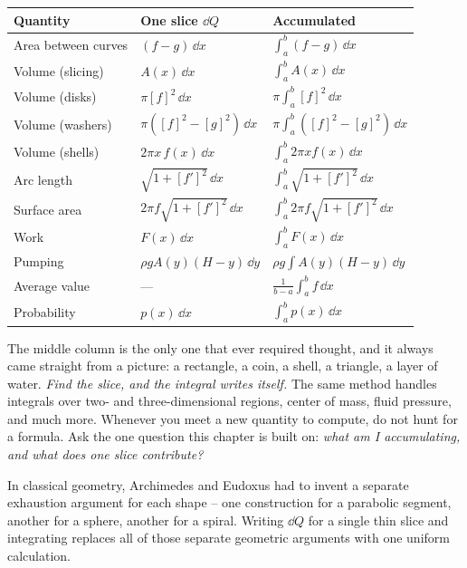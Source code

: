 \begin{center}
\begin{tabular}{@{}lll@{}}
\toprule
\textbf{Quantity} & \textbf{One slice $\dd Q$} & \textbf{Accumulated} \\
\midrule
Area between curves & $(f-g)\,\dd x$ & $\int_a^b (f-g)\,\dd x$ \\
Volume (slicing) & $A(x)\,\dd x$ & $\int_a^b A(x)\,\dd x$ \\
Volume (disks) & $\pi[f]^2\,\dd x$ & $\pi\int_a^b [f]^2\,\dd x$ \\
Volume (washers) & $\pi([f]^2-[g]^2)\,\dd x$ & $\pi\int_a^b([f]^2-[g]^2)\,\dd x$ \\
Volume (shells) & $2\pi x\,f(x)\,\dd x$ & $\int_a^b 2\pi x f(x)\,\dd x$ \\
Arc length & $\sqrt{1+[f']^2}\,\dd x$ & $\int_a^b\sqrt{1+[f']^2}\,\dd x$ \\
Surface area & $2\pi f\sqrt{1+[f']^2}\,\dd x$ & $\int_a^b 2\pi f\sqrt{1+[f']^2}\,\dd x$ \\
Work & $F(x)\,\dd x$ & $\int_a^b F(x)\,\dd x$ \\
Pumping & $\rho g A(y)(H-y)\,\dd y$ & $\rho g\int A(y)(H-y)\,\dd y$ \\
Average value & --- & $\frac{1}{b-a}\int_a^b f\,\dd x$ \\
Probability & $p(x)\,\dd x$ & $\int_a^b p(x)\,\dd x$ \\
\bottomrule
\end{tabular}
\end{center}

The middle column is the only one that ever required thought, and it always came
straight from a picture: a rectangle, a coin, a shell, a triangle, a layer of
water. \emph{Find the slice, and the integral writes itself.} The same method
handles integrals over two- and three-dimensional regions, center of mass, fluid
pressure, and much more. Whenever you meet a new quantity to
compute, do not hunt for a formula. Ask the one question this chapter is built on:
\emph{what am I accumulating, and what does one slice contribute?}

\begin{aestheticbox}
In classical geometry, Archimedes and Eudoxus had to invent a separate exhaustion argument for
each shape -- one construction for a parabolic segment, another for a sphere, another for a spiral.
Writing $\dd Q$ for a single thin slice and integrating replaces all of those separate geometric
arguments with one uniform calculation.
\end{aestheticbox}

